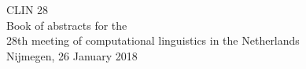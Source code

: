 \hspace{0pt}
\vspace{\fill}
\begin{center}
  {\Huge CLIN 28}\\[2em]

  Book of abstracts for the \\ 28th meeting of computational linguistics in the Netherlands \\[5cm]

  Nijmegen, 26 January 2018
\end{center}
\vspace{\fill}
\hspace{0pt}
